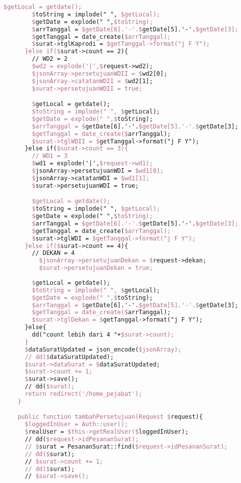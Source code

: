 \begin{lstlisting}[language=tex,basicstyle=\tiny,caption=PesanansuratController.php]
        $getLocal = getdate();
        $toString = implode(" ", $getLocal);
        $getDate = explode(" ",$toString);
        $arrTanggal = $getDate[6].'-'.$getDate[5].'-'.$getDate[3];
        $getTanggal = date_create($arrTanggal);
        $surat->tglKaprodi = $getTanggal->format("j F Y");
      }else if($surat->count == 2){
        // WD2 = 2
        $wd2 = explode('|',$request->wd2);
        $jsonArray->persetujuanWDII = $wd2[0];
        $jsonArray->catatanWDII = $wd2[1];
        $surat->persetujuanWDII = true;

        $getLocal = getdate();
        $toString = implode(" ", $getLocal);
        $getDate = explode(" ",$toString);
        $arrTanggal = $getDate[6].'-'.$getDate[5].'-'.$getDate[3];
        $getTanggal = date_create($arrTanggal);
        $surat->tglWDII = $getTanggal->format("j F Y");
      }else if($surat->count == 3){
        // WD1 = 3
        $wd1 = explode('|',$request->wd1);
        $jsonArray->persetujuanWDI = $wd1[0];
        $jsonArray->catatanWDI = $wd1[1];
        $surat->persetujuanWDI = true;

        $getLocal = getdate();
        $toString = implode(" ", $getLocal);
        $getDate = explode(" ",$toString);
        $arrTanggal = $getDate[6].'-'.$getDate[5].'-'.$getDate[3];
        $getTanggal = date_create($arrTanggal);
        $surat->tglWDI = $getTanggal->format("j F Y");
      }else if($surat->count == 4){
        // DEKAN = 4
          $jsonArray->persetujuanDekan = $request->dekan;
          $surat->persetujuanDekan = true;
          
        $getLocal = getdate();
        $toString = implode(" ", $getLocal);
        $getDate = explode(" ",$toString);
        $arrTanggal = $getDate[6].'-'.$getDate[5].'-'.$getDate[3];
        $getTanggal = date_create($arrTanggal);
        $surat->tglDekan = $getTanggal->format("j F Y");  
      }else{
        dd("count lebih dari 4 "+$surat->count);
      }
      $dataSuratUpdated = json_encode($jsonArray);
      // dd($dataSuratUpdated);
      $surat->dataSurat = $dataSuratUpdated;
      $surat->count += 1;
      $surat->save();
      // dd($surat);
      return redirect('/home_pejabat');
    }

    public function tambahPersetujuan(Request $request){
      $loggedInUser = Auth::user();
      $realUser = $this->getRealUser($loggedInUser);
      // dd($request->idPesananSurat);
      // $surat = PesananSurat::find($request->idPesananSurat);
      // dd($surat);
      // $surat->count += 1;
      // dd($surat);
      // $surat->save();


\end{lstlisting}
